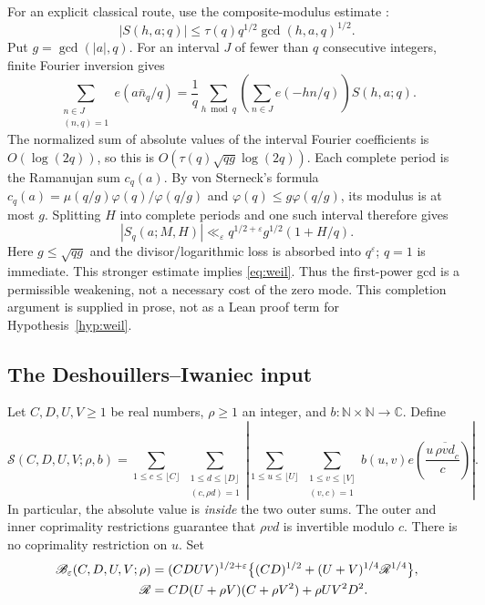 \documentclass[11pt]{article}
\theoremstyle{definition}
\begin{document}
For an explicit classical route, use the composite-modulus estimate
\cite[Corollary~11.12, equation~(11.16)]{IK}:
\[
 |S(h,a;q)|\le\tau(q)q^{1/2}\gcd(h,a,q)^{1/2}.
\]
Put $g=\gcd(|a|,q)$. For an interval $J$ of fewer than $q$ consecutive
integers, finite Fourier inversion gives
\[
 \sum_{\substack{n\in J\\(n,q)=1}}e(a\bar n_q/q)
 =\frac1q\sum_{h\bmod q}
       \left(\sum_{n\in J}e(-hn/q)\right)S(h,a;q).
\]
The normalized sum of absolute values of the interval Fourier
coefficients is $O(\log(2q))$, so this is
$O(\tau(q)\sqrt{qg}\log(2q))$.
Each complete period is the Ramanujan sum $c_q(a)$. By von Sterneck's
formula $c_q(a)=\mu(q/g)\varphi(q)/\varphi(q/g)$ and
$\varphi(q)\le g\varphi(q/g)$, its modulus is at most $g$.
Splitting $H$ into complete periods and one such interval therefore
gives
\[
 |S_q(a;M,H)|\ll_\varepsilon
 q^{1/2+\varepsilon}g^{1/2}(1+H/q).
\]
Here $g\le\sqrt{qg}$ and the divisor/logarithmic loss is absorbed into
$q^\varepsilon$; $q=1$ is immediate. This stronger estimate implies
\eqref{eq:weil}. Thus the first-power gcd is a permissible weakening,
not a necessary cost of the zero mode. This completion argument is
supplied in prose, not as a Lean proof term for Hypothesis~\ref{hyp:weil}.

\subsection{The Deshouillers--Iwaniec input}

Let $C,D,U,V\ge1$ be real numbers, $\rho\ge1$ an integer, and
$b:\mathbb N\times\mathbb N\to\mathbb C$. Define
\begin{equation}\label{eq:di-sum}
 \mathscr S(C,D,U,V;\rho,b)=
 \sum_{1\le c\le\lfloor C\rfloor}
 \ \sum_{\substack{1\le d\le\lfloor D\rfloor\\(c,\rho d)=1}}
 \left|
 \sum_{1\le u\le\lfloor U\rfloor}
 \ \sum_{\substack{1\le v\le\lfloor V\rfloor\\(v,c)=1}}
 b(u,v)e\!\left(\frac{u\,\overline{\rho vd}_c}{c}\right)
 \right|.
\end{equation}
In particular, the absolute value is \emph{inside} the two outer sums.
The outer and inner coprimality restrictions guarantee that $\rho vd$
is invertible modulo $c$. There is no coprimality restriction on $u$.
Set
\begin{align}
 \mathscr B_\varepsilon(C,D,U,V;\rho)
 ={}&(CDUV)^{1/2+\varepsilon}\bigl\{(CD)^{1/2}
       +(U+V)^{1/4}\mathscr R^{1/4}\bigr\},\label{eq:di-bound}\\
 \mathscr R={}&CD(U+\rho V)(C+\rho V^2)+\rho UV^2D^2.\notag
\end{align}
\end{document}
